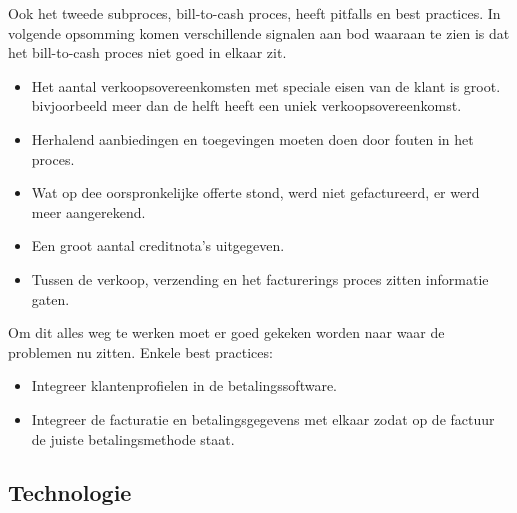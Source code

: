 Ook het tweede subproces, bill-to-cash proces, heeft pitfalls en best practices.
In volgende opsomming komen verschillende signalen aan bod waaraan te zien is dat het bill-to-cash proces niet goed in elkaar zit.
\begin{itemize}
	\item Het aantal verkoopsovereenkomsten met speciale eisen van de klant is groot. bivjoorbeeld meer dan de helft heeft een uniek verkoopsovereenkomst.
	\item Herhalend aanbiedingen en toegevingen moeten doen door fouten in het proces.
	\item Wat op dee oorspronkelijke offerte stond, werd niet gefactureerd, er werd meer aangerekend.
	\item Een groot aantal creditnota's uitgegeven.
	\item Tussen de verkoop, verzending en het facturerings proces zitten informatie gaten.
\end{itemize}
Om dit alles weg te werken moet er goed gekeken worden naar waar de problemen nu zitten. Enkele best practices:
\begin{itemize}
	\item Integreer klantenprofielen in de betalingssoftware.
	\item Integreer de facturatie en betalingsgegevens met elkaar zodat op de factuur de juiste betalingsmethode staat.
\end{itemize}


\subsection{Technologie}
